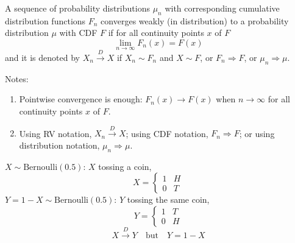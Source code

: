 

\begin{definition}
    A sequence of probability distributions $\mu_n$ with corresponding cumulative distribution functions $F_n$ converges weakly (in distribution) to a probability distribution $\mu$ with CDF $F$ if for all continuity points $x$ of $F$
    \[\lim_{n\to\infty} F_n(x) = F(x)\]
    and it is denoted by $X_n \overset{D}{\longrightarrow} X$ if $X_n \sim F_n$ and $X \sim F$, or $F_n \Rightarrow F$, or $\mu_n \Rightarrow \mu$.
\end{definition}
Notes:
\begin{enumerate}
    \item Pointwise convergence is enough: $F_n(x) \to F(x)$ when $n \to \infty$ for all continuity points $x$ of $F$.
    \item Using RV notation, $X_n \overset{D}{\longrightarrow} X$; using CDF notation, $F_n \Rightarrow F$; or using distribution notation, $\mu_n \Rightarrow \mu$.
\end{enumerate}

\begin{example}[][\relax]
    $X \sim \text{Bernoulli}(0.5)$: $X$ tossing a coin,
    \[X = \begin{cases} 1 & H\\ 0 & T\end{cases}\]
    $Y = 1 - X \sim \text{Bernoulli}(0.5)$: $Y$ tossing the same coin,
    \[Y = \begin{cases} 1 & T\\ 0 & H\end{cases}\]
    \[X \overset{D}{\longrightarrow} Y \quad \text{but} \quad Y = 1 - X\]
\end{example}

